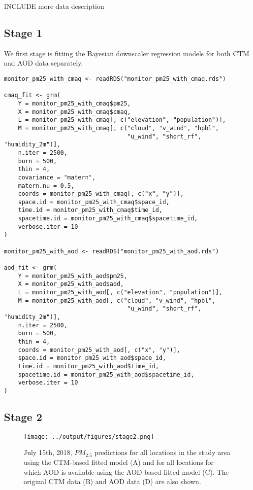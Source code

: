 \documentclass[12pt]{article}
\begin{document}
INCLUDE more data description

\subsection*{Stage 1}

We first stage is fitting the Bayesian downscaler regression models for both CTM and AOD data separately. 


\begin{lstlisting}
monitor_pm25_with_cmaq <- readRDS("monitor_pm25_with_cmaq.rds")

cmaq_fit <- grm(
    Y = monitor_pm25_with_cmaq$pm25,
    X = monitor_pm25_with_cmaq$cmaq,
    L = monitor_pm25_with_cmaq[, c("elevation", "population")],
    M = monitor_pm25_with_cmaq[, c("cloud", "v_wind", "hpbl", 
                                   "u_wind", "short_rf", "humidity_2m")],
    n.iter = 2500,
    burn = 500,
    thin = 4,
    covariance = "matern",
    matern.nu = 0.5,
    coords = monitor_pm25_with_cmaq[, c("x", "y")],
    space.id = monitor_pm25_with_cmaq$space_id,
    time.id = monitor_pm25_with_cmaq$time_id,
    spacetime.id = monitor_pm25_with_cmaq$spacetime_id,
    verbose.iter = 10
)

monitor_pm25_with_aod <- readRDS("monitor_pm25_with_aod.rds")

aod_fit <- grm(
    Y = monitor_pm25_with_aod$pm25,
    X = monitor_pm25_with_aod$aod,
    L = monitor_pm25_with_aod[, c("elevation", "population")],
    M = monitor_pm25_with_aod[, c("cloud", "v_wind", "hpbl", 
                                   "u_wind", "short_rf", "humidity_2m")],
    n.iter = 2500,
    burn = 500,
    thin = 4,
    coords = monitor_pm25_with_aod[, c("x", "y")],
    space.id = monitor_pm25_with_aod$space_id,
    time.id = monitor_pm25_with_aod$time_id,
    spacetime.id = monitor_pm25_with_aod$spacetime_id,
    verbose.iter = 10
)

\end{lstlisting}

\subsection*{Stage 2}

\begin{figure}[ht]
    \centering
    \texttt{[image: ../output/figures/stage2.png]}
    \caption{July 15th, 2018,  $PM_{2.5}$ predictions for all locations in the study area using the CTM-based fitted model (A) and for all locations for which AOD is available using the AOD-based fitted model (C). The original CTM data (B) and AOD data (D) are also shown.}
    \label{fig:stage2}
\end{figure}
\end{document}
